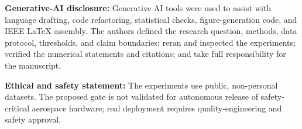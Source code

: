 \documentclass[journal]{IEEEtran}
\begin{document}
\textbf{Generative-AI disclosure:} Generative AI tools were used to assist with language drafting, code refactoring, statistical checks, figure-generation code, and IEEE LaTeX assembly. The authors defined the research question, methods, data protocol, thresholds, and claim boundaries; reran and inspected the experiments; verified the numerical statements and citations; and take full responsibility for the manuscript.

\textbf{Ethical and safety statement:} The experiments use public, non-personal datasets. The proposed gate is not validated for autonomous release of safety-critical aerospace hardware; real deployment requires quality-engineering and safety approval.

{\raggedright


\par}
\end{document}
